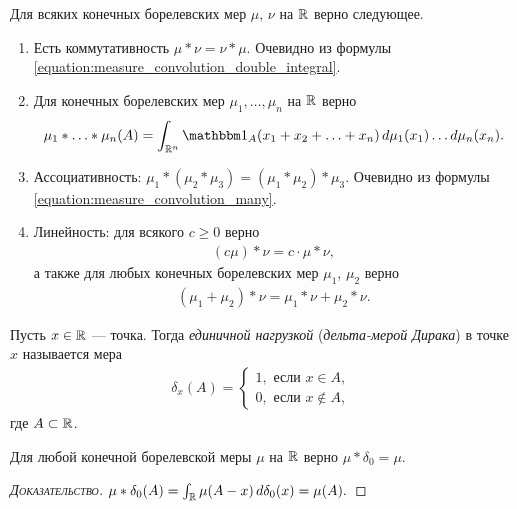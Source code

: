 \documentclass[../main.tex]{subfiles}
\begin{document}
\begin{prop} Для всяких конечных борелевских мер $ \mu $, $ \nu $ на $ \mathbb{R} $ верно следующее.
 \begin{enumerate}
  \item Есть коммутативность $ \mu \ast \nu = \nu \ast \mu $. Очевидно из формулы \eqref{equation:measure_convolution_double_integral}.
 \item Для конечных борелевских мер $ \mu_1, \ldots, \mu_n $ на $ \mathbb{R} $ верно
\begin{align}
 \label{equation:measure_convolution_many}
 \mu_1 \ast \ldots \ast \mu_n (A) = \int_{\R^{n}}\Ind_A(x_1 + x_2 + \ldots + x_n)\,d\mu_1(x_1) \ldots d\mu_n(x_n).   
\end{align}
\item Ассоциативность: $ \mu_1 \ast (\mu_2 \ast \mu_3) = (\mu_1 \ast \mu_2) \ast \mu_3 $. Очевидно из формулы \eqref{equation:measure_convolution_many}.
\item Линейность: для всякого $ c \geqslant 0 $ верно
 \begin{align*}
  (c\mu) \ast \nu = c \cdot \mu \ast \nu,
 \end{align*} а также для любых конечных борелевских мер $ \mu_1 $, $ \mu_2 $ верно
 \begin{align*}
  (\mu_1 + \mu_2) \ast \nu = \mu_1 \ast\nu + \mu_2\ast\nu.
 \end{align*} 
\end{enumerate}
\end{prop}

\begin{df}
 Пусть $ x \in \mathbb{R} $ --- точка. Тогда \textit{единичной нагрузкой} (\textit{дельта-мерой Дирака}) в точке $ x $ называется мера
 \begin{align*}
  \delta_x(A) = \begin{cases}
   1, \text{ если } x \in A, \\
   0, \text{ если } x\notin A,
  \end{cases} 
 \end{align*} где $ A \subset \mathbb{R} $.
\end{df}

\begin{prop}
 Для любой конечной борелевской меры $ \mu $ на $ \mathbb{R} $ верно $ \mu \ast \delta_0 = \mu $.
\end{prop}
\begin{proof}[\normalfont\textsc{Доказательство}]
 $ \mu \ast \delta_0(A) = \int_{\mathbb{R}} \mu(A-x)\,d\delta_0(x) = \mu(A).  $
\end{proof}
\end{document}

